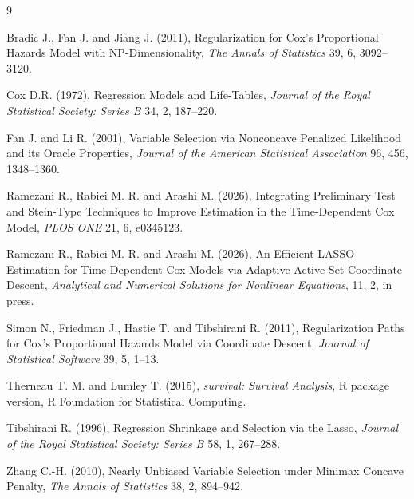 \documentclass[twoside]{article}
\begin{document}
\begin{thebibliography}{9}

Bradic J., Fan J. and Jiang J. (2011), Regularization for Cox's Proportional Hazards Model with NP-Dimensionality, {\it The Annals of Statistics} 39, 6, 3092--3120.

Cox D.R. (1972), Regression Models and Life-Tables, {\it Journal of the Royal Statistical Society: Series B} 34, 2, 187--220.

Fan J. and Li R. (2001), Variable Selection via Nonconcave Penalized Likelihood and its Oracle Properties, {\it Journal of the American Statistical Association} 96, 456, 1348--1360.


Ramezani R., Rabiei M. R. and Arashi M. (2026), Integrating Preliminary Test and Stein-Type Techniques to Improve Estimation in the Time-Dependent Cox Model, {\it PLOS ONE} 21, 6, e0345123.

Ramezani R., Rabiei M. R. and Arashi M. (2026), An Efficient LASSO Estimation for Time-Dependent Cox Models via Adaptive Active-Set Coordinate Descent, {\it Analytical and Numerical Solutions for Nonlinear Equations}, 11, 2, in press.

Simon N., Friedman J., Hastie T. and Tibshirani R. (2011), Regularization Paths for Cox's Proportional Hazards Model via Coordinate Descent, {\it Journal of Statistical Software} 39, 5, 1--13.

Therneau T. M. and Lumley T. (2015), 
\textit{survival: Survival Analysis}, 
R package version, R Foundation for Statistical Computing.


Tibshirani R. (1996), Regression Shrinkage and Selection via the Lasso, {\it Journal of the Royal Statistical Society: Series B} 58, 1, 267--288.



Zhang C.-H. (2010), Nearly Unbiased Variable Selection under Minimax Concave Penalty, {\it The Annals of Statistics} 38, 2, 894--942.







\end{thebibliography}
 
\end{document}
